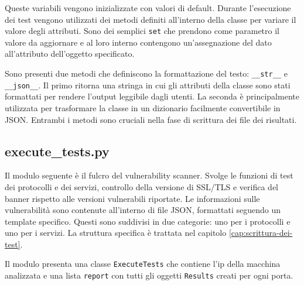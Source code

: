\documentclass[12pt]{report}
\begin{document}
Queste variabili vengono inizializzate con valori di default. Durante l'esecuzione dei test vengono utilizzati dei metodi definiti all'interno della classe per variare il valore degli attributi. Sono dei semplici \lstinline{set} che prendono come parametro il valore da aggiornare e al loro interno contengono un'assegnazione del dato all'attributo dell'oggetto specificato.

Sono presenti due metodi che definiscono la formattazione del testo: \lstinline{__str__} e \\\lstinline{__json__}. Il primo ritorna una stringa in cui gli attributi della classe sono stati formattati per rendere l'output leggibile dagli utenti. La seconda è principalmente utilizzata per trasformare la classe in un dizionario facilmente convertibile in JSON. Entrambi i metodi sono cruciali nella fase di scrittura dei file dei risultati.

\subsection{execute\_tests.py}

Il modulo seguente è il fulcro del vulnerability scanner. Svolge le funzioni di test dei protocolli e dei servizi, controllo della versione di SSL/TLS e verifica del banner rispetto alle versioni vulnerabili riportate. Le informazioni sulle vulnerabilità sono contenute all'interno di file JSON, formattati seguendo un template specifico. Questi sono suddivisi in due categorie: uno per i protocolli e uno per i servizi. La struttura specifica è trattata nel capitolo \ref{cap:scrittura-dei-test}.

Il modulo presenta una classe \lstinline{ExecuteTests} che contiene l'ip della macchina analizzata e una lista \lstinline{report} con tutti gli oggetti \lstinline{Results} creati per ogni porta.
\end{document}

